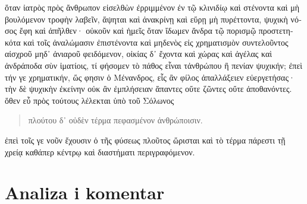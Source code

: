 \medskip


{\large

\begin{greek}

\noindent ὅταν ἰατρὸς πρὸς ἄνθρωπον εἰσελθὼν ἐρριμμένον ἐν τῷ κλινιδίῳ καὶ στένοντα καὶ μὴ βουλόμενον τροφὴν λαβεῖν, ἅψηται καὶ ἀνακρίνῃ καὶ εὕρῃ μὴ πυρέττοντα, ψυχικὴ νόσος ἔφη καὶ ἀπῆλθεν· οὐκοῦν καὶ ἡμεῖς ὅταν ἴδωμεν ἄνδρα τῷ πορισμῷ προστετηκότα καὶ τοῖς ἀναλώμασιν ἐπιστένοντα καὶ μηδενὸς εἰς χρηματισμὸν συντελοῦντος αἰσχροῦ μηδ᾽ ἀνιαροῦ φειδόμενον, οἰκίας δ᾽ ἔχοντα καὶ χώρας καὶ ἀγέλας καὶ ἀνδράποδα σὺν ἱματίοις, τί φήσομεν τὸ πάθος εἶναι τἀνθρώπου ἢ πενίαν ψυχικήν; ἐπεὶ τήν γε χρηματικήν, ὥς φησιν ὁ Μένανδρος, εἷς ἂν φίλος ἀπαλλάξειεν εὐεργετήσας· τὴν δὲ ψυχικὴν ἐκείνην οὐκ ἂν ἐμπλήσειαν ἅπαντες οὔτε ζῶντες οὔτε ἀποθανόντες. ὅθεν εὖ πρὸς τούτους λέλεκται ὑπὸ τοῦ Σόλωνος 
\begin{verse}
πλούτου δ᾽ οὐδὲν τέρμα πεφασμένον ἀνθρώποισιν.
\end{verse}
ἐπεὶ τοῖς γε νοῦν ἔχουσιν ὁ τῆς φύσεως πλοῦτος ὥρισται καὶ τὸ τέρμα πάρεστι τῇ χρείᾳ καθάπερ κέντρῳ καὶ διαστήματι περιγραφόμενον.

\end{greek}

}


\section*{Analiza i komentar}



